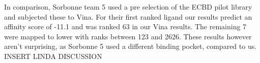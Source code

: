 \documentclass[11pt, letterpaper, titlepage]{article}
\renewcommand{\cite}{\parencite}
\begin{document}

In comparison, Sorbonne team 5 used a pre selection of the ECBD pilot library and subjected these to Vina. For their first ranked ligand our results predict an affinity score of -11.1 and was ranked 63 in our Vina results. The remaining 7 were mapped to lower with ranks between 123 and 2626. These results however aren't surprising, as Sorbonne 5 used a different binding pocket, compared to us.\\

INSERT LINDA DISCUSSION
\end{document}
